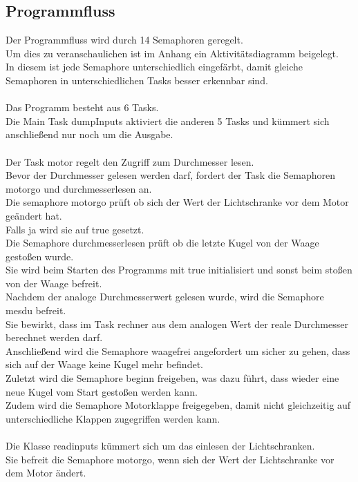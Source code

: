 \documentclass[12pt,a4paper]{article}
\begin{document}
\subsection{Programmfluss}
Der Programmfluss wird durch 14 Semaphoren geregelt.\\
Um dies zu veranschaulichen ist im Anhang ein Aktivitätsdiagramm beigelegt.\\
In diesem ist jede Semaphore unterschiedlich eingefärbt, damit gleiche Semaphoren in unterschiedlichen Tasks besser erkennbar sind.\\
\\
Das Programm besteht aus 6 Tasks.\\
Die Main Task dumpInputs aktiviert die anderen 5 Tasks und kümmert sich anschließend nur noch um die Ausgabe.\\
\\
Der Task motor regelt den Zugriff zum Durchmesser lesen.\\
Bevor der Durchmesser gelesen werden darf, fordert der Task die Semaphoren motorgo und durchmesserlesen an.\\
Die semaphore motorgo prüft ob sich der Wert der Lichtschranke vor dem Motor geändert hat.\\
Falls ja wird sie auf true gesetzt.\\
Die Semaphore durchmesserlesen prüft ob die letzte Kugel von der Waage gestoßen wurde.\\
Sie wird beim Starten des Programms mit true initialisiert und sonst beim stoßen von der Waage befreit.\\
Nachdem der analoge Durchmesserwert gelesen wurde, wird die Semaphore mesdu befreit.\\
Sie bewirkt, dass im Task rechner aus dem analogen Wert der reale Durchmesser berechnet werden darf.\\
Anschließend wird die Semaphore waagefrei angefordert um sicher zu gehen, dass sich auf der Waage keine Kugel mehr befindet.\\
Zuletzt wird die Semaphore beginn freigeben, was dazu führt, dass wieder eine neue Kugel vom Start gestoßen werden kann.\\
Zudem wird die Semaphore Motorklappe freigegeben, damit nicht gleichzeitig auf unterschiedliche Klappen zugegriffen werden kann.\\
\\
Die Klasse readinputs kümmert sich um das einlesen der Lichtschranken.\\
Sie befreit die Semaphore motorgo, wenn sich der Wert der Lichtschranke vor dem Motor ändert.\\
\end{document}
